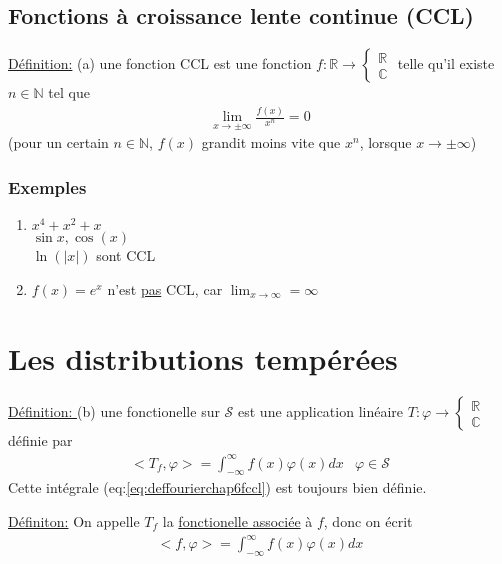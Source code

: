 \subsection{Fonctions à croissance lente continue (CCL)}
\underline{Définition:} (a) une fonction CCL est une fonction
$
	f:\mathbb R\rightarrow
	\begin{cases}
		\mathbb R
		\\
		\mathbb C
	\end{cases}$ telle qu'il existe $n\in\mathbb N$ tel que
	\begin{eqnarray*}
		\lim_{x\rightarrow\pm\infty}\frac{f(x)}{x^n}=0
	\end{eqnarray*}
	(pour un certain $n\in\mathbb N$, $f(x)$ grandit moins vite que $x^n$, lorsque $x\rightarrow\pm\infty$)
	
\subsubsection{Exemples}
\begin{enumerate}
	\item $x^4+x^2+x$\\
	$\sin{x},\cos(x)$\\
	$\ln{(|x|)}$ sont CCL
	
	\item $f(x)=e^x$ n'est \underline{pas} CCL, car $\lim_{x\rightarrow\infty}=\infty$
\end{enumerate}
\section{Les distributions tempérées}
\underline{Définition: } (b) une fonctionelle sur $\mathcal S$ est une application linéaire $T: \varphi\rightarrow
\begin{cases}
	\mathbb R
	\\
	\mathbb C
\end{cases}$
définie par
\begin{eqnarray}
	\label{eq:deffourierchap6fccl}
	<T_f,\varphi>=\int_{-\infty}^{\infty}f(x)\varphi(x)dx&\varphi\in\mathcal S
\end{eqnarray}
Cette intégrale (eq:\ref{eq:deffourierchap6fccl}) est toujours bien définie.

\underline{Définiton:} On appelle $T_f$ la \underline{fonctionelle associée} à $f$, donc on écrit
\begin{eqnarray}
	<f,\varphi>=\int_{-\infty}^{\infty}f(x)\varphi(x)dx
\end{eqnarray}

